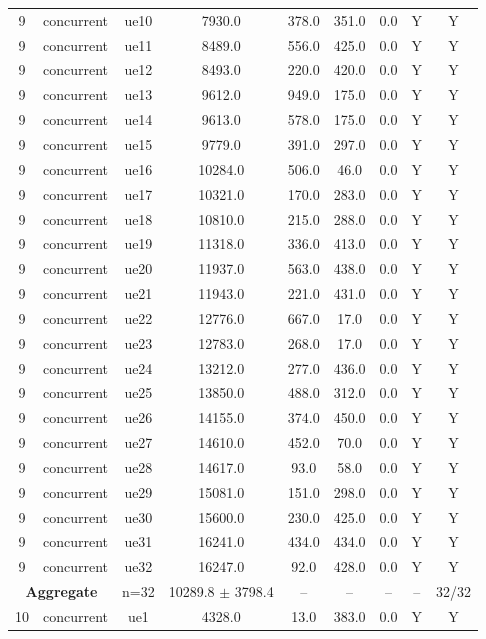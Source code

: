 \begin{table}[ht]
\begin{tabular}{|c|c|c|c|c|c|c|c|c|}
9 & concurrent & ue10 & 7930.0 & 378.0 & 351.0 & 0.0 & Y & Y \\
9 & concurrent & ue11 & 8489.0 & 556.0 & 425.0 & 0.0 & Y & Y \\
9 & concurrent & ue12 & 8493.0 & 220.0 & 420.0 & 0.0 & Y & Y \\
9 & concurrent & ue13 & 9612.0 & 949.0 & 175.0 & 0.0 & Y & Y \\
9 & concurrent & ue14 & 9613.0 & 578.0 & 175.0 & 0.0 & Y & Y \\
9 & concurrent & ue15 & 9779.0 & 391.0 & 297.0 & 0.0 & Y & Y \\
9 & concurrent & ue16 & 10284.0 & 506.0 & 46.0 & 0.0 & Y & Y \\
9 & concurrent & ue17 & 10321.0 & 170.0 & 283.0 & 0.0 & Y & Y \\
9 & concurrent & ue18 & 10810.0 & 215.0 & 288.0 & 0.0 & Y & Y \\
9 & concurrent & ue19 & 11318.0 & 336.0 & 413.0 & 0.0 & Y & Y \\
9 & concurrent & ue20 & 11937.0 & 563.0 & 438.0 & 0.0 & Y & Y \\
9 & concurrent & ue21 & 11943.0 & 221.0 & 431.0 & 0.0 & Y & Y \\
9 & concurrent & ue22 & 12776.0 & 667.0 & 17.0 & 0.0 & Y & Y \\
9 & concurrent & ue23 & 12783.0 & 268.0 & 17.0 & 0.0 & Y & Y \\
9 & concurrent & ue24 & 13212.0 & 277.0 & 436.0 & 0.0 & Y & Y \\
9 & concurrent & ue25 & 13850.0 & 488.0 & 312.0 & 0.0 & Y & Y \\
9 & concurrent & ue26 & 14155.0 & 374.0 & 450.0 & 0.0 & Y & Y \\
9 & concurrent & ue27 & 14610.0 & 452.0 & 70.0 & 0.0 & Y & Y \\
9 & concurrent & ue28 & 14617.0 & 93.0 & 58.0 & 0.0 & Y & Y \\
9 & concurrent & ue29 & 15081.0 & 151.0 & 298.0 & 0.0 & Y & Y \\
9 & concurrent & ue30 & 15600.0 & 230.0 & 425.0 & 0.0 & Y & Y \\
9 & concurrent & ue31 & 16241.0 & 434.0 & 434.0 & 0.0 & Y & Y \\
9 & concurrent & ue32 & 16247.0 & 92.0 & 428.0 & 0.0 & Y & Y \\
\multicolumn{2}{|c|}{\textbf{Aggregate}} & n=32 & 10289.8 $\pm$ 3798.4 & -- & -- & -- & -- & 32/32 \\
\hline
10 & concurrent & ue1 & 4328.0 & 13.0 & 383.0 & 0.0 & Y & Y \\

\end{tabular}
\end{table}
